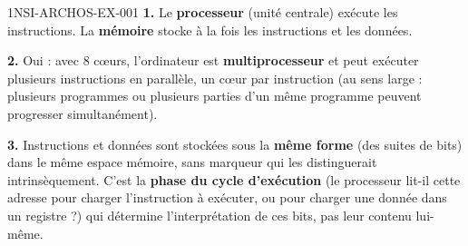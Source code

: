 \begin{corrige}{1NSI-ARCHOS-EX-001}
\textbf{1.} Le \textbf{processeur} (unité centrale) exécute les instructions. La
\textbf{mémoire} stocke à la fois les instructions et les données.

\textbf{2.} Oui : avec $8$ cœurs, l'ordinateur est \textbf{multiprocesseur} et peut exécuter
plusieurs instructions en parallèle, un cœur par instruction (au sens large : plusieurs
programmes ou plusieurs parties d'un même programme peuvent progresser simultanément).

\textbf{3.} Instructions et données sont stockées sous la \textbf{même forme} (des suites de
bits) dans le même espace mémoire, sans marqueur qui les distinguerait intrinsèquement.
C'est la \textbf{phase du cycle d'exécution} (le processeur lit-il cette adresse pour
charger l'instruction à exécuter, ou pour charger une donnée dans un registre ?) qui
détermine l'interprétation de ces bits, pas leur contenu lui-même.
\end{corrige}

%
%
